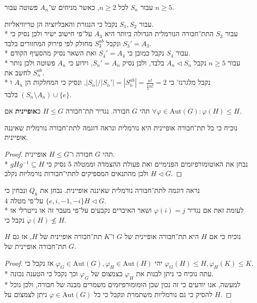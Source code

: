 \Subquestion{}
עבור $S_n$ לכל $n \ge 2$, כאשר מניחים ש־$A_n$ פשוטה עבור $n \ge 5$.

עבור $S_1, S_2$ נקבל כי הנגזרת והאבליזציה הן טריוויאליות. \\*
עבור $S_3$ התת־חבורה הנורמלית הגדולה ביותר היא $A_3$ על־פי חישוב ישיר ולכן נסיק כי $S_3' = A_3$ ונקבל $S_3^{ab}$ מחולק לפי פירוק המחזורים בלבד. \\*
עבור $S_4$ נקבל כמובן כי $S_4' = A_4$ ואת השאר נסיק מהסעיף הקודם. \\*
עבור $n \ge 5$ נקבל $A_n \triangleleft S_n$ בלבד, ולכן נסיק $S_n' = A_n$, וידוע כי $A_n$ פשוטה ולכן נותר לחשב את $S_n^{ab}$. \\*
נקבל מלגרנז' כי $|S_n| / |S_n'| = |S_n^{ab}| = \frac{n!}{\frac{1}{2}n!} = 2$, ונסיק כי המחלקות הן $A_n$ ו$(S_n \setminus A_n) \cup \{ e \}$ בלבד.

\Question{}
תהי $G$ חבורה. נגדיר תת־חבורה $H \le G$ כ\textbf{אופיינית} אם $\forall \varphi \in \text{Aut}(G) : \varphi(H) \le H$.

\Subquestion{}
נוכיח כי כל תת־חבורה אופיינית היא נורמלית ונראה דוגמה לתת־חבורה נורמלית שאיננה אופיינית.
\begin{proof}
	תהי $G$ חבורה ו־$H \le G$ אופיינית. \\*
	נבחן את האוטומורפיזמים הפנימיים ואת פעולת ההצמדה וממטלה 5 נסיק כי $g H g^{-1} \subseteq H$ ולכן מהתנאים המספיקים לתתי־חבורות נורמליות נקלב $H \triangleleft G$.
\end{proof}
נראה דוגמה לתת־חבורה נורמלית שאיננה אופיינית.
נבחן את $Q_8$ ונבחין כי $\{ e, i, -1, -i \} H \triangleleft G$ על־פי מטלה 4. \\*
לעומת זאת אם נגדיר $\varphi(i) = j$ ושאר האיברים נקבעים על־פי מעבר זה או נייטרלי אז נקבל כי $\varphi(H) \not\le H$.

\Subquestion{}
נוכיח כי אם $H$ היא תת־חבורה אופיינית של $G$ ו־$K$ תת־חבורה אופיינית של $H$, אז גם $H$ תת־חבורה אופיינית של $G$.
\begin{proof}
	יהי $\varphi_G \in \text{Aut}(G), \varphi_H \in \text{Aut}(H)$ אז נקבל כי $\varphi_G(H) \le H, \varphi_H(K) \le K$. \\*
	עתה נוכיח כי ניתן לבנות את $\varphi_H$ כצמצום של $\varphi_G$ וכך נקבל כי הטענה נכונה. \\*
	למעשה, אנו יודעים כי זה נכון שכן הומומורפיזמים משמרים מבנה של חבורה, ולכן נוכל להסיק כי גם נורמליות משתמרת ונקבל כי כל $\varphi \in \text{Aut}(G)$ ניתן לצמצום על $H$.
\end{proof}

